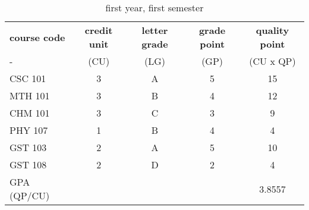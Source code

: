 \documentclass{article}
\begin{document}
	
	\begin{table}[h!]
		\begin{center}
			\caption{first year, first semester}
				\label{tab:table1}
				\begin{tabular}{l|c|c|c|c}
			\textbf{course code} & \textbf{credit unit} & \textbf{letter grade} & \textbf{grade point} & \textbf{quality point}\\
					- & (CU) & (LG) & (GP) & (CU x QP)\\
					\hline
					CSC 101 & 3 & A & 5 & 15\\
					MTH 101 & 3 & B & 4 & 12\\
					CHM 101 & 3 & C & 3 & 9\\
					PHY 107 & 1 & B & 4 & 4\\
					GST 103 & 2 & A & 5 & 10\\
					GST 108 & 2 & D & 2 & 4\\
					GPA (QP/CU) &   &   &  & 3.8557\\
					\end{tabular}
		\end{center}
		\end{table}
	
\end{document}
